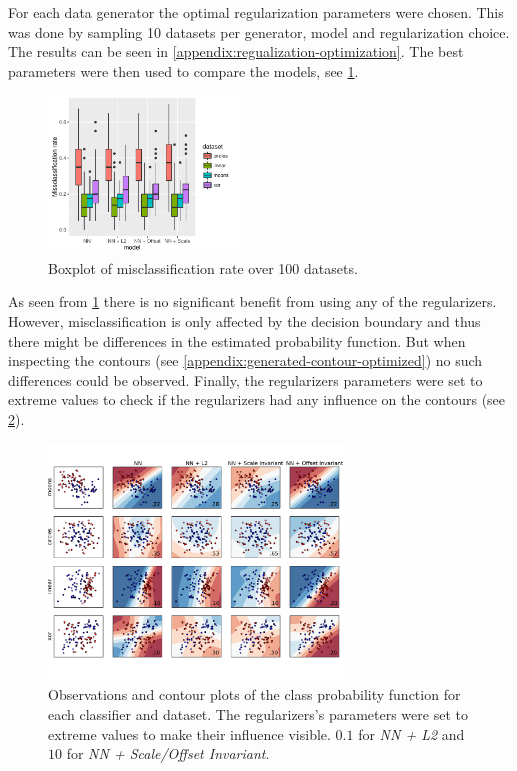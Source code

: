 For each data generator the optimal regularization parameters were chosen. This was done by sampling 10 datasets per generator, model and regularization choice. The results can be seen in \cref{appendix:regualization-optimization}. The best parameters were then used to compare the models, see \cref{fig:2d_significant}.

\begin{figure}[h]
	\centering
	\includegraphics[width=0.45\textwidth]{plots/2d_significant}
	\caption{Boxplot of misclassification rate over 100 datasets.}
	\label{fig:2d_significant}
\end{figure}

As seen from \cref{fig:2d_significant} there is no significant benefit from using any of the regularizers. However, misclassification is only affected by the decision boundary and thus there might be differences in the estimated probability function. But when inspecting the contours (see \cref{appendix:generated-contour-optimized}) no such differences could be observed. Finally, the regularizers parameters were set to extreme values to check if the regularizers had any influence on the contours (see \cref{plt:generated-contour-extream}).

\begin{figure}[ht]
	\centering
	\includegraphics[width=0.7\textwidth, trim = 0 2.2cm 0 1.5cm, clip]{plots/2d_classifier-extream}
	\caption{Observations and contour plots of the class probability function for each classifier and dataset. The regularizers's parameters were set to extreme values to make their influence visible. $0.1$ for \textit{NN + L2} and $10$ for \textit{NN + Scale/Offset Invariant}.}
	\label{plt:generated-contour-extream}
\end{figure}
